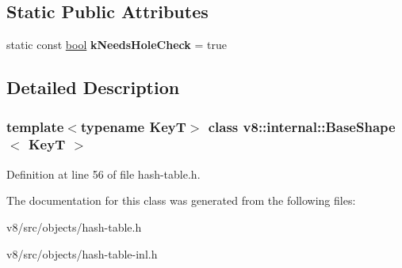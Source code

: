 \subsection*{Static Public Attributes}
\begin{DoxyCompactItemize}
\item 
\mbox{\label{classv8_1_1internal_1_1BaseShape_a38218eaf86f83f541a2bbe74dffa27f2}} 
static const \mbox{\hyperlink{classbool}{bool}} {\bfseries k\+Needs\+Hole\+Check} = true
\end{DoxyCompactItemize}


\subsection{Detailed Description}
\subsubsection*{template$<$typename KeyT$>$\newline
class v8\+::internal\+::\+Base\+Shape$<$ Key\+T $>$}



Definition at line 56 of file hash-\/table.\+h.



The documentation for this class was generated from the following files\+:\begin{DoxyCompactItemize}
\item 
v8/src/objects/hash-\/table.\+h\item 
v8/src/objects/hash-\/table-\/inl.\+h\end{DoxyCompactItemize}
